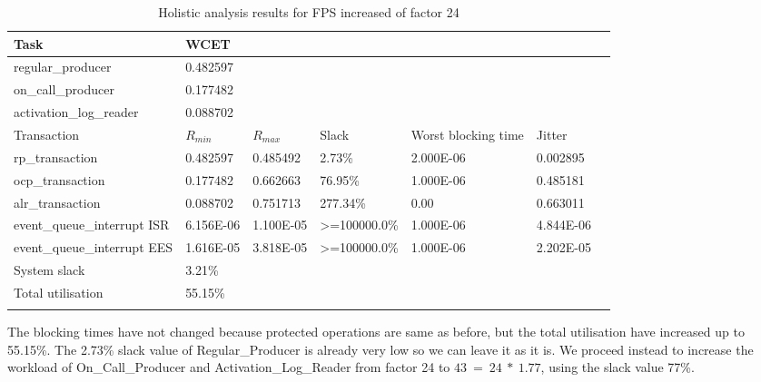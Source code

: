 \documentclass{article}
\begin{document}
\begin{longtable}{lllllll}
   \toprule
   Task & WCET \\
   \midrule
   regular\_producer & 0.482597 \\
   on\_call\_producer & 0.177482 \\
   activation\_log\_reader & 0.088702 \\
   \toprule
   \toprule
   Transaction & $R_{min}$ & $R_{max}$ & Slack & Worst blocking time & Jitter \\
   \midrule
   rp\_transaction & 0.482597 & 0.485492  & 2.73\% &  2.000E-06 & 0.002895 \\
   ocp\_transaction & 0.177482 & 0.662663 & 76.95\% & 1.000E-06 & 0.485181 \\
   alr\_transaction & 0.088702 & 0.751713 & 277.34\% & 0.00 & 0.663011 \\
   event\_queue\_interrupt ISR & 6.156E-06 & 1.100E-05 & >=100000.0\% & 1.000E-06 & 4.844E-06 \\
   event\_queue\_interrupt EES & 1.616E-05 & 3.818E-05 & >=100000.0\% & 1.000E-06 & 2.202E-05 \\
   \toprule
   \toprule
   System slack & 3.21\% \\
   Total utilisation & 55.15\% \\
   \bottomrule
   \caption{Holistic analysis results for FPS increased of factor 24}
\label{tab:holistic-fps-24}
\end{longtable}

The blocking times have not changed because protected operations are same as before, but the total utilisation have increased up to 55.15\%. The 2.73\% slack value of Regular\_Producer is already very low so we can leave it as it is. We proceed instead to increase the workload of On\_Call\_Producer and Activation\_Log\_Reader from factor 24 to $43\ =\ 24\ *\ 1.77$, using the slack value 77\%.
\end{document}
